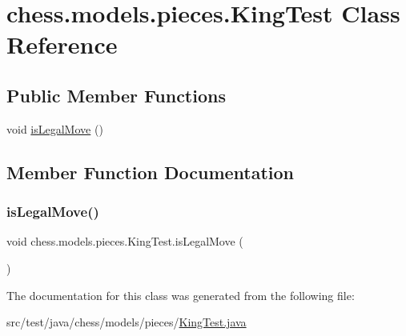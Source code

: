 \hypertarget{classchess_1_1models_1_1pieces_1_1_king_test}{}\section{chess.\+models.\+pieces.\+King\+Test Class Reference}
\label{classchess_1_1models_1_1pieces_1_1_king_test}
\subsection*{Public Member Functions}
\begin{DoxyCompactItemize}
\item 
void \mbox{\hyperlink{classchess_1_1models_1_1pieces_1_1_king_test_afbd1263f341c3f9420e09a7d5b08bc69}{is\+Legal\+Move}} ()
\end{DoxyCompactItemize}


\subsection{Member Function Documentation}
\mbox{\label{classchess_1_1models_1_1pieces_1_1_king_test_afbd1263f341c3f9420e09a7d5b08bc69}} 
\subsubsection{\texorpdfstring{is\+Legal\+Move()}{isLegalMove()}}
{\footnotesize\ttfamily void chess.\+models.\+pieces.\+King\+Test.\+is\+Legal\+Move (\begin{DoxyParamCaption}{ }\end{DoxyParamCaption})}



The documentation for this class was generated from the following file\+:\begin{DoxyCompactItemize}
\item 
src/test/java/chess/models/pieces/\mbox{\hyperlink{_king_test_8java}{King\+Test.\+java}}\end{DoxyCompactItemize}

